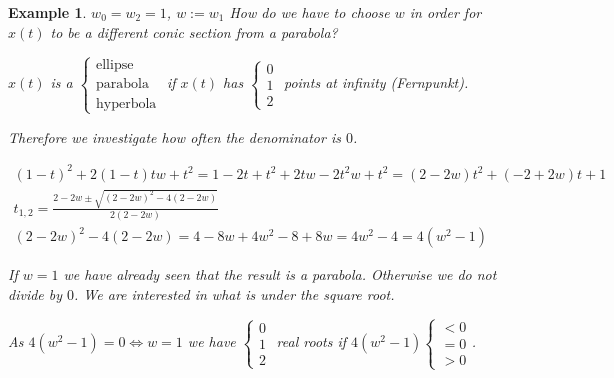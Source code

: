 \documentclass[]{article}
\newtheorem{example}{Example}
\begin{document}
\begin{example}
	$w_0 = w_2 = 1$, $w:=w_1$ How do we have to choose $w$ in order for $x(t)$ to be a different conic section from a parabola?
	
	$x(t)$ is a $\begin{cases}
		\text{ellipse}\\
		\text{parabola}\\
		\text{hyperbola}
	\end{cases}$ if $x(t)$ has $\begin{cases}
	0\\
	1\\
	2
	\end{cases}$ points at infinity (Fernpunkt).
	
	Therefore we investigate how often the denominator is $0$. 
	
	\begin{align*}
		(1-t)^2 + 2(1-t)tw + t^2 = 1 - 2t + t^2 + 2tw - 2t^2w + t^2 = (2-2w)t^2 + (-2+2w)t + 1\\
		t_{1,2} = \frac{2-2w \pm \sqrt{(2-2w)^2 - 4(2-2w)}}{2(2-2w)}\\
		(2-2w)^2 - 4(2-2w) = 4 - 8w + 4w^2 - 8 + 8w = 4w^2 - 4 = 4(w^2 - 1)
	\end{align*}
	
	If $w=1$ we have already seen that the result is a parabola. Otherwise we do not divide by $0$. We are interested in what is under the square root.
	
	As $4(w^2-1) = 0 \iff w=1$ we have $\begin{cases}0\\ 1\\ 2\end{cases}$ real roots if $4(w^2-1) \begin{cases}<0\\ =0\\ >0\end{cases}$.
\end{example}
\end{document}
